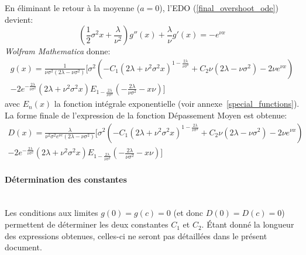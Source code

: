 En éliminant le retour à la moyenne ($a=0$), l'\acs{EDO} (\ref{final_overshoot_ode}) devient:
\begin{equation}\label{particular_overshoot_ode}
    \left(\frac{1}{2}\sigma^2x+\frac{\lambda}{\nu^2}\right)g''(x)+\frac{\lambda}{\nu}g'(x) =-e^{\nu x}
\end{equation}
\textit{Wolfram Mathematica} donne:
\[
\begin{aligned}
    g(x)=\frac{1}{{\nu\sigma^2(2\lambda-\nu\sigma^2)}}\Bigg[\sigma^2\left(-C_1 \left(2 \lambda +\nu ^2 \sigma ^2 x\right)^{1-\frac{2 \lambda }{\nu  \sigma ^2}}+C_2 \nu  \left(2 \lambda -\nu  \sigma ^2\right)-2 \nu  e^{\nu  x}\right) \\-2 e^{-\frac{2 \lambda }{\nu  \sigma ^2}} \left(2 \lambda +\nu ^2 \sigma ^2 x\right) E_{1-\frac{2 \lambda }{\nu  \sigma ^2}}\left(-\frac{2 \lambda }{\nu  \sigma ^2}-x \nu \right)\Bigg]
\end{aligned}
\]
avec $E_n(x)$ la fonction intégrale exponentielle (voir annexe~\ref{special_functions}). \\
La forme finale de l'expression de la fonction Dépassement Moyen est obtenue:
\begin{equation}\label{sol_overshoot}
    \begin{aligned}
            D(x)=\frac{\lambda}{{\nu^2\sigma^2e^{\nu c}(2\lambda-\nu\sigma^2)}}\Bigg[\sigma^2\left(-C_1 \left(2 \lambda +\nu ^2 \sigma ^2 x\right)^{1-\frac{2 \lambda }{\nu  \sigma ^2}}+C_2 \nu  \left(2 \lambda -\nu  \sigma ^2\right)-2 \nu  e^{\nu  x}\right) \\-2 e^{-\frac{2 \lambda }{\nu  \sigma ^2}} \left(2 \lambda +\nu ^2 \sigma ^2 x\right) E_{1-\frac{2 \lambda }{\nu  \sigma ^2}}\left(-\frac{2 \lambda }{\nu  \sigma ^2}-x \nu \right)\Bigg]
    \end{aligned}
\end{equation}

\paragraph{Détermination des constantes}\phantom{}\\
Les conditions aux limites $g(0)=g(c)=0$ (et donc $D(0)=D(c)=0$) permettent de déterminer les deux constantes $C_1$ et $C_2$. Étant donné la longueur des expressions obtenues, celles-ci ne seront pas détaillées dans le présent document.

